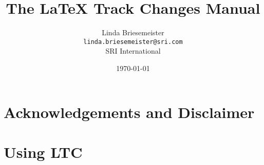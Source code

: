 \documentclass{report}
\title{The \LaTeX{} Track Changes Manual \version}
\author{%
Linda Briesemeister\\
\texttt{linda.briesemeister@sri.com}\\
SRI International
}
\date{\today}
\begin{document}
\maketitle

\tableofcontents

\chapter*{Acknowledgements and Disclaimer}




\chapter{Using LTC}







%


\end{document}

